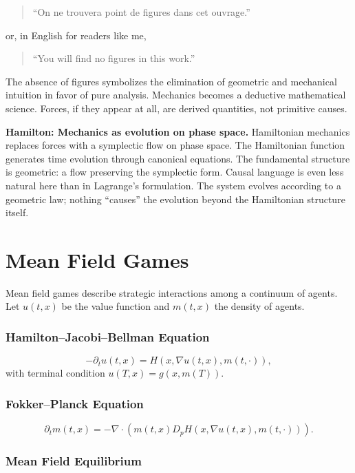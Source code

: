 \documentclass[12pt]{article}
\begin{document}
\begin{quote}
``On ne trouvera point de figures dans cet ouvrage.''
\end{quote}

or, in English for readers like me,

\begin{quote}
``You will find no figures in this work.''
\end{quote}

The absence of figures symbolizes the elimination of geometric and mechanical intuition in favor of pure analysis. Mechanics becomes a deductive mathematical science. Forces, if they appear at all, are derived quantities, not primitive causes.

\textbf{Hamilton: Mechanics as evolution on phase space.} Hamiltonian mechanics replaces forces with a symplectic flow on phase space. The Hamiltonian function generates time evolution through canonical equations. The fundamental structure is geometric: a flow preserving the symplectic form. Causal language is even less natural here than in Lagrange's formulation. The system evolves according to a geometric law; nothing ``causes'' the evolution beyond the Hamiltonian structure itself.




\section{Mean Field Games}

Mean field games describe strategic interactions among a continuum of agents. Let $u(t, x)$ be the value function and $m(t, x)$ the density of agents.

\subsubsection{Hamilton--Jacobi--Bellman Equation}
\[
-\partial_t u(t, x) = H\left(x, \nabla u(t, x), m(t, \cdot)\right),
\]
with terminal condition $u(T, x) = g(x, m(T))$.

\subsubsection{Fokker--Planck Equation}
\[
\partial_t m(t, x) = -\nabla \cdot \left(m(t, x) D_p H(x, \nabla u(t, x), m(t, \cdot))\right).
\]

\subsubsection{Mean Field Equilibrium}
\end{document}

